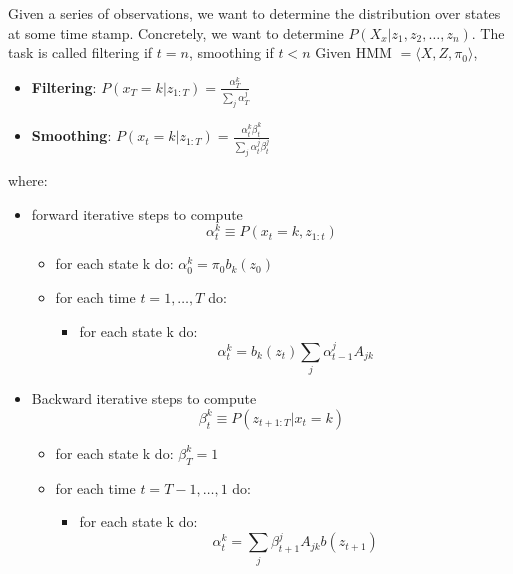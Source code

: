 Given a series of observations, we want to determine the distribution over states at some time stamp. Concretely, we want to determine $P(X_{x}|z_{1},z_{2},\dots,z_{n})$. The task is called filtering if $t=n$, smoothing if $t<n$
Given HMM $= \langle X, Z, \pi_{0} \rangle$,
\begin{itemize}
    \item \textbf{Filtering}: $P(x_{T} = k | z_{1:T}) = \frac{\alpha_{T}^{k}}{\sum_{j}\alpha_{T}^{j}}$
    \item \textbf{Smoothing}: $P(x_{t} = k | z_{1:T}) = \frac{\alpha_{t}^{k}\beta^{k}_{t}}{\sum_{j}\alpha_{t}^{j} \beta^{j}_{t}}$
\end{itemize}
where:
\begin{itemize}
    \item forward iterative steps to compute
        \begin{equation}
            \alpha^{k}_{t} \equiv P(x_{t} = k, z_{1:t})
        \end{equation}
        \begin{itemize}
            \item for each state k do: $\alpha^{k}_{0} = \pi_{0}b_{k}(z_{0})$
            \item for each time $t = 1, \dots, T$ do:
            \begin{itemize}
                \item for each state k do:
                \begin{equation}
                    \alpha^{k}_{t} = b_{k}(z_{t}) \sum_{j} \alpha_{t-1}^{j}A_{jk}
                \end{equation}
            \end{itemize}
        \end{itemize}
        
    \item Backward iterative steps to compute
        \begin{equation}
            \beta^{k}_{t} \equiv P(z_{t+1:T}| x_{t} = k)
        \end{equation}
        \begin{itemize}
            \item for each state k do: $\beta^{k}_{T} = 1$
            \item for each time $t = T-1, \dots, 1$ do:
            \begin{itemize}
                \item for each state k do:
                \begin{equation}
                    \alpha^{k}_{t} = \sum_{j} \beta_{t+1}^{j}A_{jk}b(z_{t+1})
                \end{equation}
            \end{itemize}
        \end{itemize}
\end{itemize}


